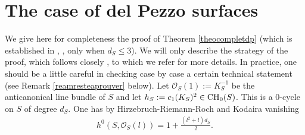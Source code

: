 \documentclass[10pt]{article}
\begin{document}
\section{The case of del Pezzo surfaces \label{seccomplement}}
We give  here for completeness the proof of Theorem \ref{theocompletdp} (which is established in \cite{colliot}, \cite{voisindelpezzo}, only when $d_S\leq 3$).  We will only describe the strategy of the proof, which follows closely \cite{voisindelpezzo}, to which we refer for more details. In practice, one should  be a little  careful in checking  case by case a certain technical statement (see Remark \ref{reamresteaprouver} below).
Let $\mathcal{O}_S(1):=K_S^{-1}$ be the anticanonical line bundle of $S$ and let $h_S:=c_1(K_S)^2\in{\rm CH}_0(S)$. This is a $0$-cycle on $S$ of degree $d_S$. One has by Hirzebruch-Riemann-Roch and Kodaira vanishing
\begin{eqnarray}\label{eqHRR}h^0(S,\mathcal{O}_S(l))=1+\frac{(l^2+l)d_S}{2}.\end{eqnarray}
\end{document}
